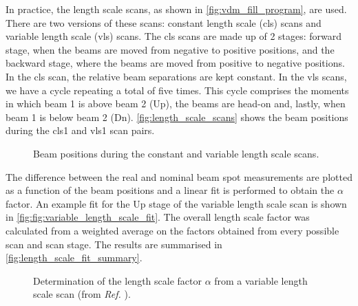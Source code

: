 In practice, the length scale scans, as shown in \autoref{fig:vdm_fill_program}, are used. There are two versions of these scans: constant length scale (cls) scans and variable length scale (vls) scans. The cls scans are made up of 2 stages: forward stage, when the beams are moved from negative to positive positions, and the backward stage, where the beams are moved from positive to negative positions. In the cls scan, the relative beam separations are kept constant. In the vls scans, we have a cycle repeating a total of five times. This cycle comprises the moments in which beam 1 is above beam 2 (Up), the beams are head-on and, lastly, when beam 1 is below beam 2 (Dn). \autoref{fig:length_scale_scans} shows the beam positions during the cls1 and vls1 scan pairs.

\begin{figure}[!htb]
	\centering
	\caption[Beam positions in length scale scans]{Beam positions during the constant and variable length scale scans.}
	\label{fig:length_scale_scans}
\end{figure}

The difference between the real and nominal beam spot measurements are plotted as a function of the beam positions and a linear fit is performed to obtain the $\alpha$ factor. An example fit for the Up stage of the variable length scale scan is shown in \autoref{fig:fig:variable_length_scale_fit}. The overall length scale factor was calculated from a weighted average on the factors obtained from every possible scan and scan stage. The results are summarised in \autoref{fig:length_scale_fit_summary}.

\begin{figure}[!htb]
	\centering
	\caption[Length scale factor determination]{Determination of the length scale factor $\alpha$ from a variable length scale scan (from \textit{Ref.} \cite{CMS-DP-2024-068}).}
	\label{fig:fig:variable_length_scale_fit}
\end{figure}

